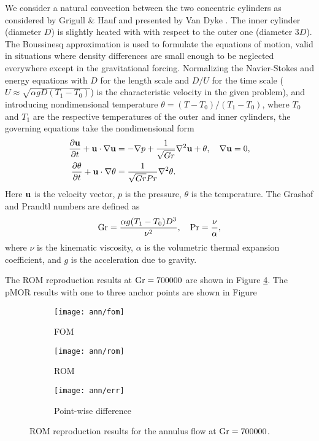 \noindent
We consider a natural convection between the two concentric cylinders as
considered by Grigull \& Hauf \cite{grigull66} and presented by Van Dyke
\cite{vandyke82}. The inner cylinder (diameter $D$) is slightly heated with
with respect to the outer one (diameter $3D$). The Boussinesq approximation is
used to formulate the equations of motion, valid in situations where density
differences are small enough to be neglected everywhere except in the
gravitational forcing.  Normalizing the Navier-Stokes and energy equations with
$D$ for the length scale and $D/U$ for the time scale ($U \approx \sqrt{\alpha
g D (T_1-T_0)}$) is the characteristic velocity in the given problem), and
introducing nondimensional temperature $\theta=(T-T_0)/(T_1-T_0)$, where $T_0$
and $T_1$ are the respective temperatures of the outer and inner cylinders, the
governing equations take the nondimensional form
\begin{align}
   \frac{\partial {\bf u}}{\partial t} + {\bf u} \cdot \nabla {\bf u} & = -\nabla p + \frac{1}{\sqrt{Gr}}
\nabla^2 {\bf u} + \theta, \quad \nabla {\bf u} = 0, \\ \frac{\partial \theta}{\partial t} + {\bf u} \cdot
\nabla \theta & = \frac{1}{\sqrt{Gr}Pr} \nabla^2 \theta.
\end{align}
Here ${\bf u}$ is the velocity vector, $p$ is the pressure, $\theta$ is the
temperature.  The Grashof and Prandtl numbers are defined as
\begin{equation}
   {\rm Gr} = \frac{\alpha g (T_1-T_0) D^3}{\nu^2}, \quad {\rm Pr} =
\frac{\nu}{\alpha},
\end{equation}
where $\nu$ is the kinematic viscosity, $\alpha$ is the volumetric thermal
expansion coefficient, and $g$ is the acceleration due to gravity. 

The ROM reproduction results at $\rm Gr=700000$ are shown in Figure
\ref{fig:4}.
The pMOR results with one to three anchor points are shown in Figure

\begin{figure}[!h]
     \centering
     \begin{subfigure}[b]{0.3\textwidth}
         \centering
         \texttt{[image: ann/fom]}
         \caption{FOM}
         \label{fig:4_a}
     \end{subfigure}
     \begin{subfigure}[b]{0.3\textwidth}
         \centering
         \texttt{[image: ann/rom]}
         \caption{ROM}
         \label{fig:4_b}
     \end{subfigure}
     \begin{subfigure}[b]{0.3\textwidth}
         \centering
         \texttt{[image: ann/err]}
         \caption{Point-wise difference}
         \label{fig:4_c}
     \end{subfigure}
     \caption{ROM reproduction results for the annulus flow at $\rm
Gr=700000$.} \label{fig:4}
\end{figure}

